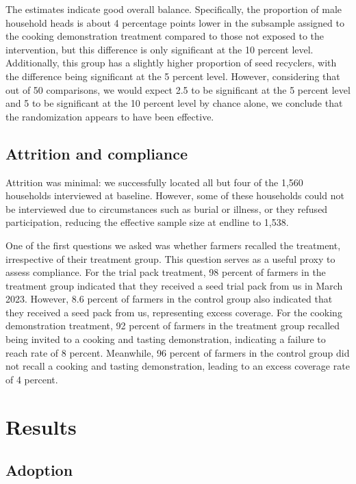 \documentclass[english]{article}\usepackage[]{graphicx}\usepackage[]{xcolor}
\begin{document}
The estimates indicate good overall balance. Specifically, the proportion
of male household heads is about 4 percentage points lower in the
subsample assigned to the cooking demonstration treatment compared
to those not exposed to the intervention, but this difference is only
significant at the 10 percent level. Additionally, this group has
a slightly higher proportion of seed recyclers, with the difference
being significant at the 5 percent level. However, considering that
out of 50 comparisons, we would expect 2.5 to be significant at the
5 percent level and 5 to be significant at the 10 percent level by
chance alone, we conclude that the randomization appears to have been
effective.

\subsection{Attrition and compliance}

Attrition was minimal: we successfully located all but four of the
1,560 households interviewed at baseline. However, some of these households
could not be interviewed due to circumstances such as burial or illness,
or they refused participation, reducing the effective sample size
at endline to 1,538.

One of the first questions we asked was whether farmers recalled the
treatment, irrespective of their treatment group. This question serves
as a useful proxy to assess compliance. For the trial pack treatment,
98 percent of farmers in the treatment group indicated that they received
a seed trial pack from us in March 2023. However, 8.6 percent of farmers
in the control group also indicated that they received a seed pack
from us, representing excess coverage. For the cooking demonstration
treatment, 92 percent of farmers in the treatment group recalled being
invited to a cooking and tasting demonstration, indicating a failure
to reach rate of 8 percent. Meanwhile, 96 percent of farmers in the
control group did not recall a cooking and tasting demonstration,
leading to an excess coverage rate of 4 percent.

\section{Results}

\subsection{Adoption\label{subsec:Adoption}}
\end{document}
